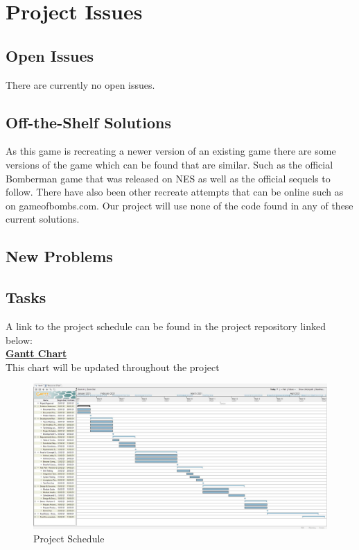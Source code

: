 \documentclass[12pt, titlepage]{article}
\begin{document}
\section{Project Issues}

\subsection{Open Issues}

There are currently no open issues.

\subsection{Off-the-Shelf Solutions}

As this game is recreating a newer version of an existing game there are some versions of the game which can be found that are similar. Such as the official Bomberman game that was released on NES as well as the official sequels to follow. There have also been other recreate attempts that can be online such as on gameofbombs.com. Our project will use none of the code found in any of these current solutions.

\subsection{New Problems}

\subsection{Tasks}

A link to the project schedule can be found in the project repository linked below:\\

\href{https://gitlab.cas.mcmaster.ca/chowdr11/3xa3/-/tree/master/BlankProjectTemplate/ProjectSchedule}
{\textbf{Gantt Chart}}\\

\noindent This chart will be updated throughout the project

\begin{figure}[h]
\centering
\includegraphics[width=16cm]{ProjectSchedule}
\caption{Project Schedule}
\label{fig:figure2}
\end{figure}
\end{document}
